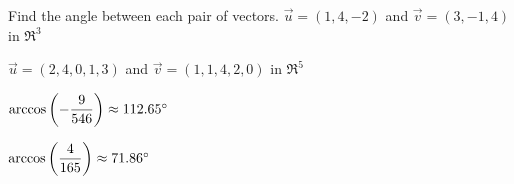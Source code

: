 
\begin{Exercise}[
name={},
title={}, 
difficulty=0,
origin={\cite{SM}}]
Find the angle between each pair of vectors.
\Question $\vec{u} = (1,4,-2)$ and $\vec{v} = (3,-1,4)$ in $\Re^3$

\Question $\vec{u} = (2,4,0,1,3)$ and $\vec{v} = (1,1,4,2,0)$ in $\Re^5$
\end{Exercise}

\begin{Answer}
\Question $\arccos\left(-\dfrac{9}{546}\right) \approx 112.65^\circ\relax$

\Question $\arccos\left(\dfrac{4}{165}\right) \approx 71.86^\circ\relax$
\end{Answer}
